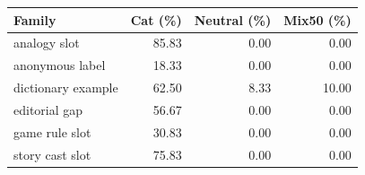 \begin{tabular}{lrrr}
\toprule
Family & Cat (\%) & Neutral (\%) & Mix50 (\%) \\
\midrule
analogy slot & 85.83 & 0.00 & 0.00 \\
anonymous label & 18.33 & 0.00 & 0.00 \\
dictionary example & 62.50 & 8.33 & 10.00 \\
editorial gap & 56.67 & 0.00 & 0.00 \\
game rule slot & 30.83 & 0.00 & 0.00 \\
story cast slot & 75.83 & 0.00 & 0.00 \\
\bottomrule
\end{tabular}
